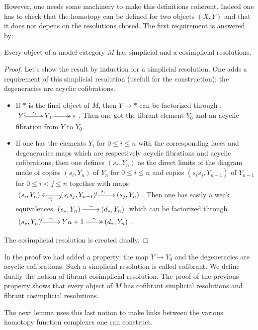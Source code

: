 \begin{refsection}
However, one needs some machinery to make this definitions coherent. Indeed one has to check that the homotopy can be defined for two objects $(X,Y)$ and that it does not depens on the resolutions chosed. The first requirement is answered by: 

\begin{prop}
Every object of a model category $M$ has simplicial and a cosimplicial resolutions.
\end{prop}

\begin{proof}
Let's show the result by induction for a simplicial resolution. One adds a requirement of this simplicial resolution (usefull for the construction): the degeneracies are acyclic cofibrations.
\begin{itemize}
\item If $*$ is the final object of $M$, then $Y \rightarrow *$ can be factorized through : $\xymatrix{{Y} \ar@{^{(}->}[r]^{\sim} & {Y_0} \ar@{->>}[r] & {*}}$. Then one got the fibrant element $Y_0$ and an acyclic fibration from $Y$ to $Y_0$.
\item If one has the elements $Y_i$ for $0 \leq i \leq n$ with the corresponding faces and degeneracies maps which are respectively acyclic fibrations and acyclic cofibrations, then one defines $(s_*,Y_n)$ as the direct limits of the diagram made of copies $(s_i,Y_n)$ of $Y_n$ for $0 \leq i \leq n$ and copies $(s_i s_j, Y_{n-1})$ of $Y_{n-1}$ for $0 \leq i < j \leq n$ together with maps $\xymatrix{{(s_i,Y_n)}  & {(s_i s_j, Y_{n-1})} \ar@{^{(}->}[l]^{s_{j-1}} \ar@{^{(}->}[r]^{s_{i}} & {(s_j,Y_n)}}$. Then one has easily a weak equivalences $\xymatrix{{(s_*,Y_n)} \ar[r]^{\sim} & {(d_*,Y_n)}}$ which can be factorized through $\xymatrix{{(s_*,Y_n)} \ar@{^{(}->}[r]^{\sim} &{Y{n+1}} \ar@{->>}[r]^{\sim} & {(d_*,Y_n)}}$.
\end{itemize}
The cosimplicial resolution is created dually.
\end{proof}


\begin{rmk}
In the proof we had added a property: the map $Y \rightarrow Y_0$ and the degeneracies are acyclic cofibrations. Such a simplicial resolution is called cofibrant. We define dually the notion of fibrant cosimplicial resolution. The proof of the previous property shows that every object of $M$ has cofibrant simplicial resolutions and fibrant cosimplicial resolutions.
\end{rmk}

The next lemma uses this last notion to make links between the various homotopy function complexes one can construct.


\end{refsection}
